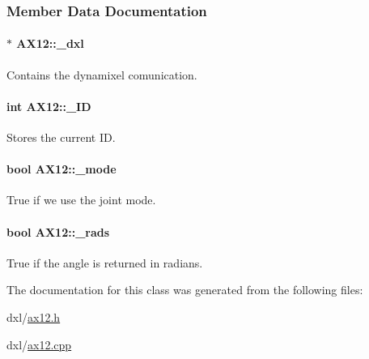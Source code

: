 \subsubsection{Member Data Documentation}
\hypertarget{a00001_a16df7ccc0a8d3c585a93b6916734bb17}{}
\paragraph[{\+\_\+dxl}]{$\ast$ A\+X12\+::\+\_\+dxl\hspace{0.3cm}{\ttfamily [private]}}\label{a00001_a16df7ccc0a8d3c585a93b6916734bb17}


Contains the dynamixel comunication. 

\hypertarget{a00001_a0ae2b35fee3d120075e1d8f1e2055804}{}
\paragraph[{\+\_\+\+I\+D}]{\setlength{\rightskip}{0pt plus 5cm}int A\+X12\+::\+\_\+\+I\+D\hspace{0.3cm}{\ttfamily [private]}}\label{a00001_a0ae2b35fee3d120075e1d8f1e2055804}


Stores the current I\+D. 

\hypertarget{a00001_a2fd07e2e636003227a32d09d211bd6d4}{}
\paragraph[{\+\_\+mode}]{\setlength{\rightskip}{0pt plus 5cm}bool A\+X12\+::\+\_\+mode\hspace{0.3cm}{\ttfamily [private]}}\label{a00001_a2fd07e2e636003227a32d09d211bd6d4}


True if we use the joint mode. 

\hypertarget{a00001_aba71492043d7a3226f0793db57372bec}{}
\paragraph[{\+\_\+rads}]{\setlength{\rightskip}{0pt plus 5cm}bool A\+X12\+::\+\_\+rads\hspace{0.3cm}{\ttfamily [private]}}\label{a00001_aba71492043d7a3226f0793db57372bec}


True if the angle is returned in radians. 



The documentation for this class was generated from the following files\+:\begin{DoxyCompactItemize}
\item 
dxl/\hyperlink{a00011}{ax12.\+h}\item 
dxl/\hyperlink{a00010}{ax12.\+cpp}\end{DoxyCompactItemize}
